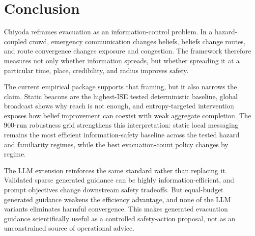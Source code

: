 \section{Conclusion}
\label{sec:conclusion}

Chiyoda reframes evacuation as an information-control problem. In a
hazard-coupled crowd, emergency communication changes beliefs, beliefs change
routes, and route convergence changes exposure and congestion. The framework
therefore measures not only whether information spreads, but whether spreading
it at a particular time, place, credibility, and radius improves safety.

The current empirical package supports that framing, but it also narrows the
claim. Static beacons are the highest-ISE tested deterministic baseline,
global broadcast shows why reach is not enough, and entropy-targeted
intervention exposes how belief improvement can coexist with weak aggregate
completion. The 900-run robustness grid strengthens this interpretation:
static local messaging remains the most efficient information-safety baseline
across the tested hazard and familiarity regimes, while the best
evacuation-count policy changes by regime.

The LLM extension reinforces the same standard rather than replacing it.
Validated sparse generated guidance can be highly information-efficient, and
prompt objectives change downstream safety tradeoffs. But equal-budget
generated guidance weakens the efficiency advantage, and none of the LLM
variants eliminates harmful convergence. This makes generated evacuation
guidance scientifically useful as a controlled safety-action proposal, not as
an unconstrained source of operational advice.
